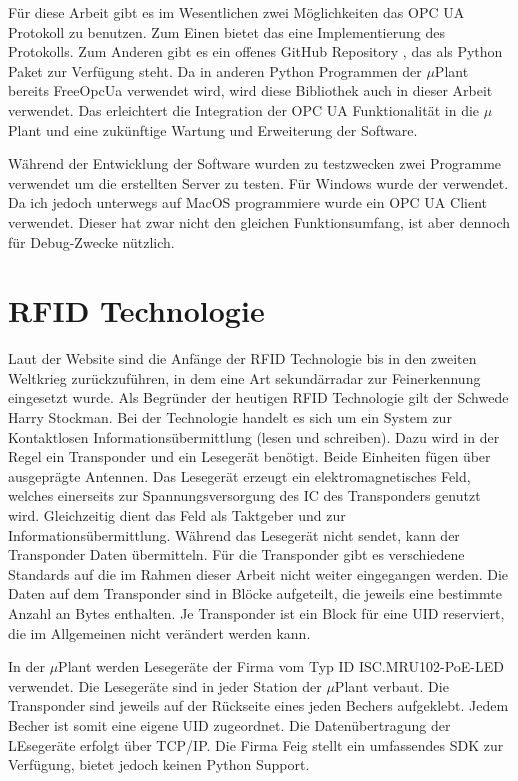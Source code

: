 Für diese Arbeit gibt es im Wesentlichen zwei Möglichkeiten das OPC UA Protokoll zu benutzen. 
Zum Einen bietet das \cite[Qt Framework]{QtOPCUA} eine Implementierung des Protokolls. 
Zum Anderen gibt es ein offenes GitHub Repository \cite[FreeOpcUa]{asyncua}, das als Python Paket zur Verfügung steht. 
Da in anderen Python Programmen der $\mu$Plant bereits FreeOpcUa verwendet wird, wird diese Bibliothek auch in dieser Arbeit verwendet.
Das erleichtert die Integration der OPC UA Funktionalität in die $\mu$Plant und eine zukünftige Wartung und Erweiterung der Software.

Während der Entwicklung der Software wurden zu testzwecken zwei Programme verwendet um die erstellten Server zu testen. 
Für Windows wurde der \cite[OPC UA Client UaExpert]{UaExpert}verwendet. Da ich jedoch unterwegs auf MacOS programmiere wurde 
ein OPC UA Client \cite[OPC UA Client für Mac]{uaClientMac} verwendet. 
Dieser hat zwar nicht den gleichen Funktionsumfang, ist aber dennoch für Debug-Zwecke nützlich. 

\section{RFID Technologie}

Laut der Website \cite[RFID Grundlagen]{RFIDGrundlagen} sind die Anfänge der RFID Technologie bis in den zweiten Weltkrieg zurückzuführen, 
in dem eine Art sekundärradar zur Feinerkennung eingesetzt wurde. Als Begründer der heutigen RFID Technologie gilt der Schwede Harry Stockman. 
Bei der Technologie handelt es sich um ein System zur Kontaktlosen Informationsübermittlung (lesen und schreiben). 
Dazu wird in der Regel ein Transponder und ein Lesegerät benötigt. Beide Einheiten fügen über ausgeprägte Antennen.
Das Lesegerät erzeugt ein elektromagnetisches Feld, welches einerseits zur Spannungsversorgung des IC des Transponders genutzt wird.
Gleichzeitig dient das Feld als Taktgeber und zur Informationsübermittlung. 
Während das Lesegerät nicht sendet, kann der Transponder Daten übermitteln. 
Für die Transponder gibt es verschiedene Standards auf die im Rahmen dieser Arbeit nicht weiter eingegangen werden. 
Die Daten auf dem Transponder sind in Blöcke aufgeteilt, die jeweils eine bestimmte Anzahl an Bytes enthalten.
Je Transponder ist ein Block für eine UID reserviert, die im Allgemeinen nicht verändert werden kann.

In der $\mu$Plant werden Lesegeräte der Firma \cite[FEIG GmbH]{RFIDFeig} vom Typ ID ISC.MRU102-PoE-LED verwendet. 
Die Lesegeräte sind in jeder Station der $\mu$Plant verbaut.
Die Transponder sind jeweils auf der Rückseite eines jeden Bechers aufgeklebt. 
Jedem Becher ist somit eine eigene UID zugeordnet. Die Datenübertragung der LEsegeräte erfolgt über TCP/IP.
Die Firma Feig stellt ein umfassendes SDK zur Verfügung, bietet jedoch keinen Python Support.



